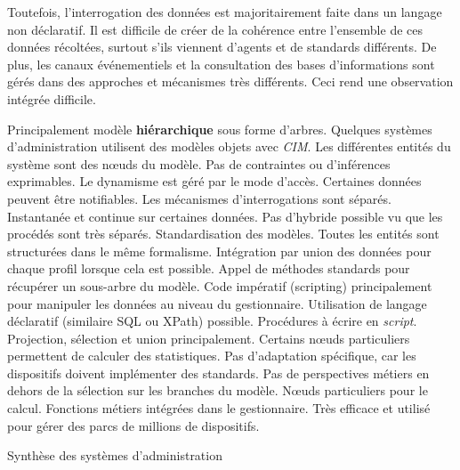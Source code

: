 Toutefois, l'interrogation des données est majoritairement faite dans un langage non déclaratif. Il est difficile de créer de la cohérence entre l'ensemble de ces données récoltées, surtout s'ils viennent d'agents et de standards différents. De plus, les canaux événementiels et la consultation des bases d'informations sont gérés dans des approches et mécanismes très différents. Ceci rend une observation intégrée difficile.

\begin{table}[!ht]
\criteretabDonnee
    {Principalement modèle \textbf{hiérarchique} sous forme d'arbres. Quelques systèmes d'administration utilisent des modèles objets avec \textit{CIM}.}
    {Les différentes entités du système sont des nœuds du modèle. Pas de contraintes ou d'inférences exprimables.}
    {Le dynamisme est géré par le mode d'accès. Certaines données peuvent être notifiables. Les mécanismes d'interrogations sont séparés.}
\criteretabTraitement
    {Instantanée et continue sur certaines données. Pas d'hybride possible vu que les procédés sont très séparés.}
    {Standardisation des modèles. Toutes les entités sont structurées dans le même formalisme. Intégration par union des données pour chaque profil lorsque cela est possible.}
    {Appel de méthodes standards pour récupérer un sous-arbre du modèle. Code impératif (scripting) principalement pour manipuler les données au niveau du gestionnaire. Utilisation de langage déclaratif (similaire SQL ou XPath) possible.}
    {Procédures à écrire en \textit{script}. Projection, sélection et union principalement. Certains nœuds particuliers permettent de calculer des statistiques.}
\criteretabAdaptabilite
    {Pas d'adaptation spécifique, car les dispositifs doivent implémenter des standards.}
    {Pas de perspectives métiers en dehors de la sélection sur les branches du modèle.}
    {Nœuds particuliers pour le calcul. Fonctions métiers intégrées dans le gestionnaire.}
    {Très efficace et utilisé pour gérer des parcs de millions de dispositifs.}
\caption{Synthèse des systèmes d'administration}\label{tab:rw:supervision:administration:synthese}
\end{table}